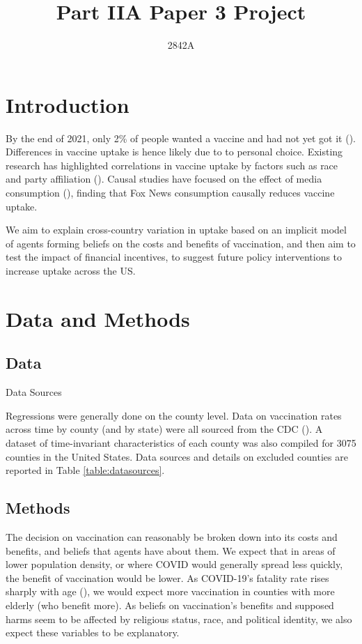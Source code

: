 \documentclass[12pt]{article}
\title{Part IIA Paper 3 Project}
\author{
	2842A
}
\newcommand\wordcount{
	\immediate\write18{texcount -sum -1 \jobname.tex > count.txt} 
	
}
\begin{document}
	
	\begin{spacing}{1.5} %
		\section{Introduction}
		By the end of 2021, only 2\% of people wanted a vaccine and had not yet got it (\cite{kff_kff_2022}). Differences in vaccine uptake is hence likely due to to personal choice. Existing research has highlighted correlations in vaccine uptake by factors such as race and party affiliation (\cite{viswanath_individual_2021}). Causal studies have focused on the effect of media consumption (\cite{pinna_cable_2021}), finding that Fox News consumption causally reduces vaccine uptake.
		
		We aim to explain cross-country variation in uptake based on an implicit model of agents forming beliefs on the costs and benefits of vaccination, and then aim to test the impact of financial incentives, to suggest future policy interventions to increase uptake across the US.
		
		\section{Data and Methods}
		\subsection{Data}
		
		\begin{table}
			\caption{Data Sources}
			
			\label{table:datasources}
		\end{table}
	
		Regressions were generally done on the county level. Data on vaccination rates across time by county (and by state) were all sourced from the CDC (\cite{cdc_covid-19_2022}). A dataset of time-invariant characteristics of each county was also compiled for 3075 counties in the United States. Data sources and details on excluded counties are reported in Table \ref{table:datasources}.
		
		\subsection{Methods}
		The decision on vaccination can reasonably be broken down into its costs and benefits, and beliefs that agents have about them. We expect that in areas of lower population density, or where COVID would generally spread less quickly, the benefit of vaccination would be lower. As COVID-19's fatality rate rises sharply with age (\cite{levin_assessing_2020}), we would expect more vaccination in counties with more elderly (who benefit more). As beliefs on vaccination's benefits and supposed harms seem to be affected by religious status, race, and political identity, we also expect these variables to be explanatory.
		

\end{spacing}
\end{document}
